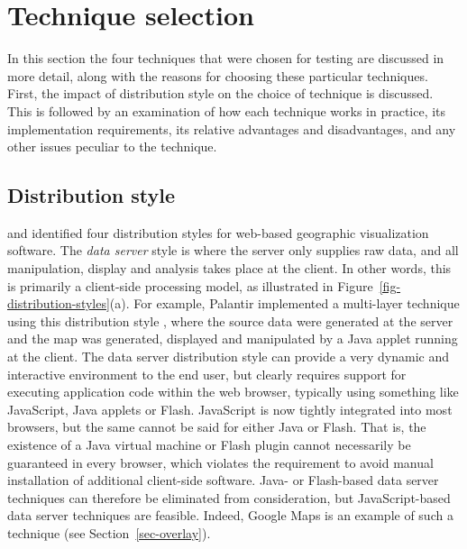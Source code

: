 \documentclass[acmnow]{acmtrans2m}
\begin{document}
\section{Technique selection}
\label{sec-techniques}

In this section the four techniques that were chosen for testing are
discussed in more detail, along with the reasons for choosing these
particular techniques. First, the impact of distribution style on the
choice of technique is discussed. This is followed by an examination of
how each technique works in practice, its implementation requirements,
its relative advantages and disadvantages, and any other issues peculiar
to the technique.


\subsection{Distribution style}
\label{sec-distribution}

 and  identified four
distribution styles for web-based geographic visualization software. The
\emph{data server} style is where the server only supplies raw data, and
all manipulation, display and analysis takes place at the client. In
other words, this is primarily a client-side processing model, as
illustrated in Figure~\ref{fig-distribution-styles}(a). For example,
Palantir implemented a multi-layer technique using this distribution
style \cite{Papa-N-1998-Palantir}, where the source data were generated
at the server and the map was generated, displayed and manipulated by a
Java applet running at the client. The data server distribution style
can provide a very dynamic and interactive environment to the end user,
but clearly requires support for executing application code within the
web browser, typically using something like JavaScript, Java applets or
Flash. JavaScript is now tightly integrated into most browsers, but the
same cannot be said for either Java or Flash. That is, the existence of
a Java virtual machine or Flash plugin cannot necessarily be guaranteed
in every browser, which violates the requirement to avoid manual
installation of additional client-side software. Java- or Flash-based
data server techniques can therefore be eliminated from consideration,
but JavaScript-based data server techniques are feasible. Indeed, Google
Maps is an example of such a technique (see Section~\ref{sec-overlay}).
\end{document}
